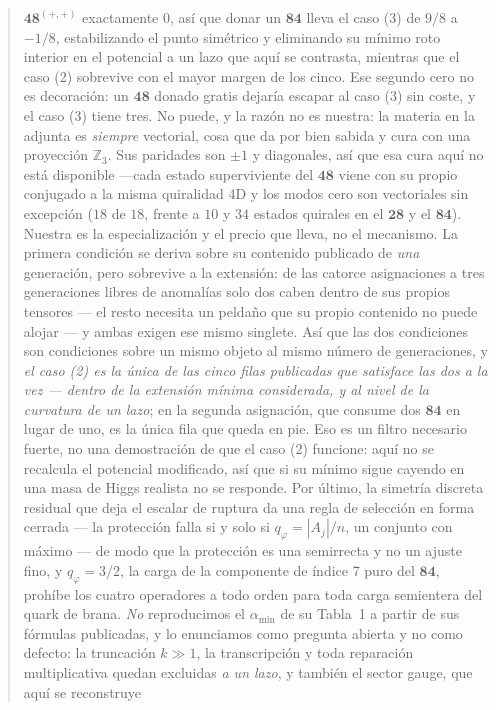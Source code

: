 \documentclass[11pt,a4paper]{article}
\newcommand{\ZZ}{\mathbb{Z}}
\newcommand{\rep}[1]{\mathbf{#1}}
\newcommand{\amin}{\alpha_{\min}}
\begin{document}
\begin{abstract}
$\rep{48}^{(+,+)}$ exactamente $0$, así que donar un $\rep{84}$ lleva el caso (3) de $9/8$ a $-1/8$,
estabilizando el punto simétrico y eliminando su mínimo roto interior en el potencial a un lazo que
aquí se contrasta, mientras que el caso (2) sobrevive con el mayor margen de los cinco. Ese segundo cero no es decoración: un $\rep{48}$ donado gratis dejaría escapar al caso (3) sin
coste, y el caso (3) tiene tres. No puede, y la razón no es nuestra: la materia en la adjunta es
\emph{siempre} vectorial, cosa que \cite{GMN} da por bien sabida y cura con una proyección $\ZZ_3$.
Sus paridades son $\pm1$ y diagonales, así que esa cura aquí no está disponible ---cada estado
superviviente del $\rep{48}$ viene con su propio conjugado a la misma quiralidad 4D y los modos cero
son vectoriales sin excepción ($18$ de $18$, frente a $10$ y $34$ estados quirales en el $\rep{28}$ y
el $\rep{84}$). Nuestra es la especialización y el precio que lleva, no el mecanismo. La primera condición se deriva sobre su contenido publicado de \emph{una} generación, pero
sobrevive a la extensión: de las catorce asignaciones a tres generaciones libres de anomalías solo
dos caben dentro de sus propios tensores --- el resto necesita un peldaño que su propio contenido no
puede alojar --- y ambas exigen ese mismo singlete. Así que las dos condiciones son condiciones
sobre un mismo objeto al mismo número de generaciones, y \emph{el caso (2) es la única de las cinco
filas publicadas que satisface las dos a la vez --- dentro de la extensión mínima considerada, y al
nivel de la curvatura de un lazo}; en la segunda asignación, que consume dos $\rep{84}$ en lugar de
uno, es la única fila que queda en pie. Eso es un filtro necesario fuerte, no una demostración de que
el caso (2) funcione: aquí no se recalcula el potencial modificado, así que si su mínimo sigue
cayendo en una masa de Higgs realista no se responde.
Por último, la simetría discreta residual que deja el escalar de ruptura da una regla de selección en
forma cerrada --- la protección falla si y solo si $q_\varphi=|A_j|/n$, un conjunto con máximo ---
de modo que la protección es una semirrecta y no un ajuste fino, y $q_\varphi=3/2$, la carga de la
componente de índice 7 puro del $\rep{84}$, prohíbe los cuatro operadores a todo orden para toda
carga semientera del quark de brana.
\emph{No} reproducimos el $\amin$ de su Tabla~1 a partir de sus fórmulas publicadas, y lo enunciamos
como pregunta abierta y no como defecto: la truncación $k\gg1$, la transcripción y toda reparación
multiplicativa quedan excluidas \emph{a un lazo}, y también el sector gauge, que aquí se reconstruye

\end{abstract}
\end{document}
